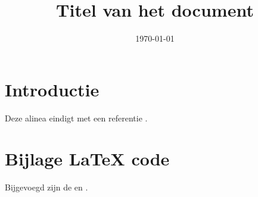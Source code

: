 \documentclass{uva-inf-article}
\title{Titel van het document}
\date{\today}
\begin{document}
\maketitle




\section{Introductie}
\lipsum[1][1-3] 
Deze alinea eindigt met een referentie \parencite{vanwijk21}.
\lipsum[2-3]


\printbibliography


\appendix 
\section{Bijlage {\LaTeX} code}
Bijgevoegd zijn de  en 
.

\end{document}
